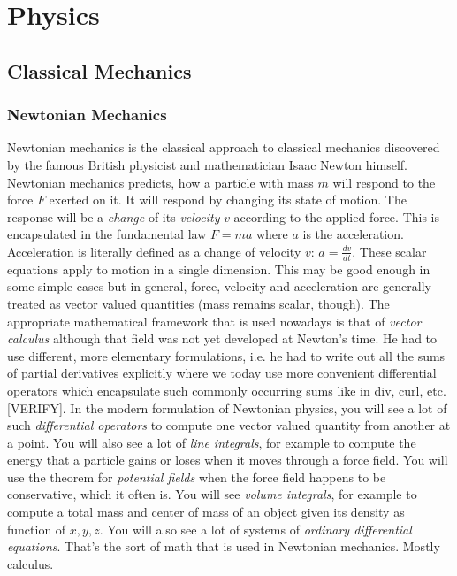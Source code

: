 \section{Physics}

\subsection{Classical Mechanics}

\subsubsection{Newtonian Mechanics}
Newtonian mechanics is the classical approach to classical mechanics discovered by the famous British physicist and mathematician Isaac Newton himself. Newtonian mechanics predicts, how a particle with mass $m$ will respond to the force $F$ exerted on it. It will respond by changing its state of motion. The response will be a \emph{change} of its \emph{velocity} $v$ according to the applied force. This is encapsulated in the fundamental law $F = m a$ where $a$ is the acceleration. Acceleration is literally defined as a change of velocity $v$: $a = \frac{dv}{dt}$. These scalar equations apply to motion in a single dimension. This may be good enough in some simple cases but in general, force, velocity and acceleration are generally treated as vector valued quantities (mass remains scalar, though). The appropriate mathematical framework that is used nowadays is that of \emph{vector calculus} although that field was not yet developed at Newton's time. He had to use different, more elementary formulations, i.e. he had to write out all the sums of partial derivatives explicitly where we today use more convenient differential operators which encapsulate such commonly occurring sums like in div, curl, etc. [VERIFY]. In the modern formulation of Newtonian physics, you will see a lot of such \emph{differential operators} to compute one vector valued quantity from another at a point. You will also see a lot of \emph{line integrals}, for example to compute the energy that a particle gains or loses when it moves through a force field. You will use the theorem for \emph{potential fields} when the force field happens to be conservative, which it often is. You will see \emph{volume integrals}, for example to compute a total mass and center of mass of an object given its density as function of $x,y,z$. You will also see a lot of systems of \emph{ordinary differential equations}. That's the sort of math that is used in Newtonian mechanics. Mostly calculus.

